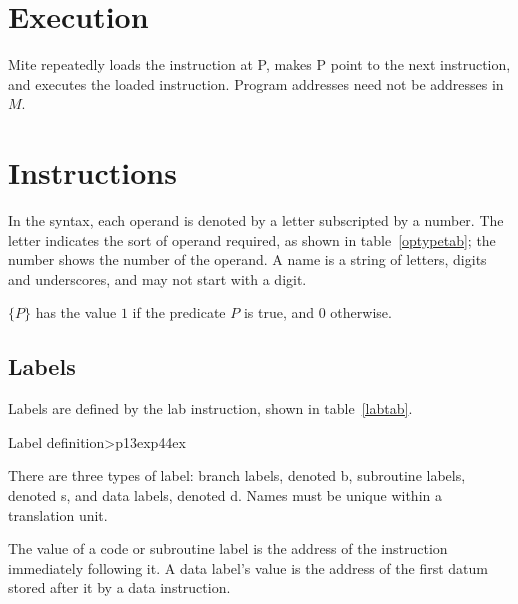 \documentclass[english]{scrartcl}
\newcommand{\synfont}{\sffamily}
\newcommand{\syn}[1]{{\synfont #1}}
\newenvironment{insttab}[1]
    {\begin{ctable}{#1}{>{\synfont}p{13ex}p{44ex}}\toprule}
    {\bottomrule\end{ctable}}
\begin{document}
\section{Execution}

Mite repeatedly loads the instruction at \syn{P}, makes \syn{P} point to
the next instruction, and executes the loaded instruction. Program addresses
need not be addresses in $M$.



\section{Instructions}

In the syntax, each operand is denoted by a letter subscripted by a number.
The letter indicates the sort of operand required, as shown in
table~\ref{optypetab}; the number shows the number of the operand. A name is
a string of letters, digits and underscores, and may not start with a digit.


$\{P\}$ has the value $1$ if the predicate $P$ is true, and $0$ otherwise.


\subsection{Labels}

Labels are defined by the \syn{lab} instruction, shown in table~\ref{labtab}.

\begin{insttab}{Label definition\label{labtab}}

\end{insttab}

There are three types of label: branch labels, denoted \syn{b}, subroutine
labels, denoted \syn{s}, and data labels, denoted \syn{d}. Names must be
unique within a translation unit.

The value of a code or subroutine label is the address of the instruction
immediately following it. A data label's value is the address of the first
datum stored after it by a data instruction.
\end{document}
